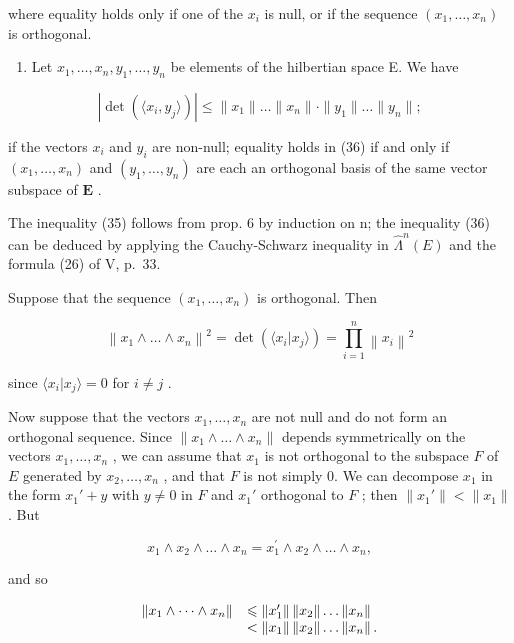where equality holds only if one of the \(x_{i}\) is null, or if the sequence \((x_{1},\dots,x_{n})\) is orthogonal.

\begin{enumerate}
\def\labelenumi{\alph{enumi})}
\setcounter{enumi}{1}
\tightlist
\item
  Let \(x_{1}, \ldots, x_{n}, y_{1}, \ldots, y_{n}\) be elements of the hilbertian space E. We have
\end{enumerate}

\[
\left| \det (\langle x _ {i}, y _ {j} \rangle) \right| \leqslant \| x _ {1} \| \dots \| x _ {n} \| \cdot \| y _ {1} \| \dots \| y _ {n} \|;\tag{36}
\]

if the vectors \(x_{i}\) and \(y_{i}\) are non-null; equality holds in (36) if and only if \((x_{1},\ldots ,x_{n})\) and \((y_{1},\dots,y_{n})\) are each an orthogonal basis of the same vector subspace of \(\mathbf{E}\) .

The inequality (35) follows from prop. 6 by induction on n; the inequality (36) can be deduced by applying the Cauchy-Schwarz inequality in \(\hat{\Lambda}^{n}(E)\) and the formula (26) of V, p.~33.

Suppose that the sequence \((x_{1},\dots,x_{n})\) is orthogonal. Then

\[
\left\| x _ {1} \wedge \dots \wedge x _ {n} \right\| ^ {2} = \det (\langle x _ {i} | x _ {j} \rangle) = \prod_ {i = 1} ^ {n} \left\| x _ {i} \right\| ^ {2}
\]

since \(\langle x_i|x_j\rangle = 0\) for \(i\neq j\) .

Now suppose that the vectors \(x_{1}, \ldots, x_{n}\) are not null and do not form an orthogonal sequence. Since \(\| x_{1} \wedge \ldots \wedge x_{n} \|\) depends symmetrically on the vectors \(x_{1}, \ldots, x_{n}\) , we can assume that \(x_{1}\) is not orthogonal to the subspace \(F\) of \(E\) generated by \(x_{2}, \ldots, x_{n}\) , and that \(F\) is not simply 0. We can decompose \(x_{1}\) in the form \(x_{1}' + y\) with \(y \neq 0\) in \(F\) and \(x_{1}'\) orthogonal to \(F\) ; then \(\| x_{1}' \| < \| x_{1} \|\) . But

\[
x _ {1} \wedge x _ {2} \wedge \ldots \wedge x _ {n} = x _ {1} ^ {\prime} \wedge x _ {2} \wedge \ldots \wedge x _ {n},
\]

and so

\[
\begin{array}{r l} \left\| x _ {1} \wedge \dots \wedge x _ {n} \right\| & \leqslant \left\| x _ {1} ^ {\prime} \right\| \left\| x _ {2} \right\| \dots \left\| x _ {n} \right\| \\ & <   \left\| x _ {1} \right\| \left\| x _ {2} \right\| \dots \left\| x _ {n} \right\|. \end{array}
\]

